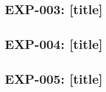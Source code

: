 \subsection{EXP-003: [title]}
\label{sec:method-exp003}

\subsection{EXP-004: [title]}
\label{sec:method-exp004}

\subsection{EXP-005: [title]}
\label{sec:method-exp005}

